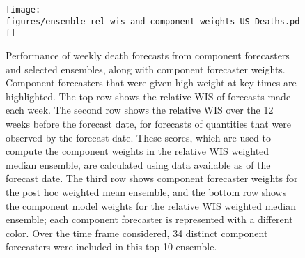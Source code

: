 \documentclass[11pt,3p,authoryear]{elsarticle}
\begin{document}
\begin{figure}
\texttt{[image: figures/ensemble\_rel\_wis\_and\_component\_weights\_US\_Deaths.pdf]}
\caption{Performance of weekly death forecasts from component forecasters and selected ensembles, along with component forecaster weights. Component forecasters that were given high weight at key times are highlighted. The top row shows the relative WIS of forecasts made each week. The second row shows the relative WIS over the 12 weeks before the forecast date, for forecasts of quantities that were observed by the forecast date. These scores, which are used to compute the component weights in the relative WIS weighted median ensemble, are calculated using data available as of the forecast date. The third row shows component forecaster weights for the post hoc weighted mean ensemble, and the bottom row shows the component model weights for the relative WIS weighted median ensemble; each component forecaster is represented with a different color. Over the time frame considered, 34 distinct component forecasters were included in this top-10 ensemble.}
\label{fig:component_weights_deaths}
\end{figure}
\end{document}
